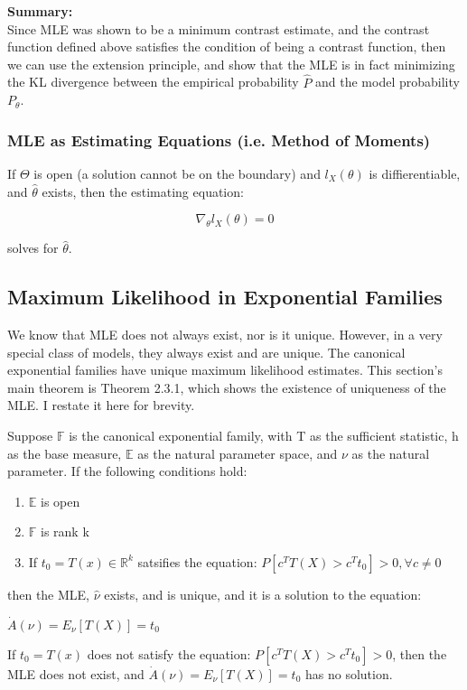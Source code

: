 			\textbf{Summary:}\\
			Since MLE was shown to be a minimum contrast estimate, and the contrast function defined above satisfies the condition of being a contrast function, then we can use the extension principle, and show that the MLE is in fact minimizing the KL divergence between the empirical probability $\hat{P}$ and the model probability $P_\theta$.

		\subsubsection{MLE as Estimating Equations (i.e. Method of Moments)}
			If $\Theta$ is open (a solution cannot be on the boundary) and $l_X(\theta)$ is diffierentiable, and $\hat{\theta}$ exists, then the estimating equation:

			$$\nabla_\theta l_X(\theta) = 0$$

			solves for $\hat{\theta}$. 

	\subsection{Maximum Likelihood in Exponential Families}
		We know that MLE does not always exist, nor is it unique. However, in a very special class of models, they always exist and are unique. The canonical exponential families have unique maximum likelihood estimates. This section's main theorem is Theorem 2.3.1, which shows the existence of uniqueness of the MLE. I restate it here for brevity.

		\begin{theorem}
			\label{thm:ef_exist_unique}

			Suppose $\mathbb{F}$ is the canonical exponential family, with T as the sufficient statistic, h as the base measure, $\mathbb{E}$ as the natural parameter space, and $\nu$ as the natural parameter. If the following conditions hold:
			
			\begin{enumerate}
				\item $\mathbb{E}$ is open
				\item $\mathbb{F}$ is rank k
				\item If $t_0 = T(x) \in \mathbb{R}^k$ satsifies the equation: $P [ c^T T(X) > c^T t_0 ] > 0, \forall c \neq 0$
			\end{enumerate}

			then the MLE, $\hat{\nu}$ exists, and is unique, and it is a solution to the equation:

			$\dot{A}(\nu) = E_\nu [ T(X) ] = t_0$

			If $t_0 = T(x)$ does not satisfy the equation: $P [ c^T T(X) > c^T t_0 ] > 0$, then the MLE does not exist, and $\dot{A}(\nu) = E_\nu [ T(X) ] = t_0$ has no solution.
		\end{theorem}


